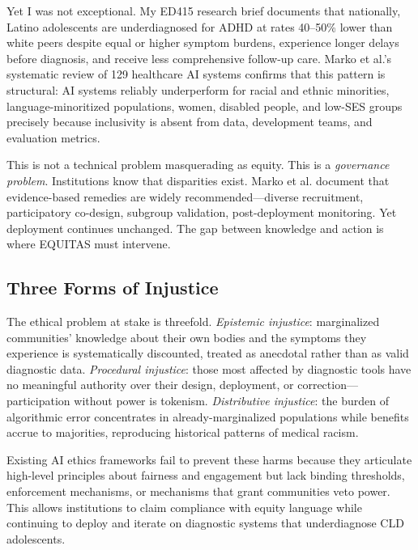 \documentclass[12pt,a4paper]{article}
\begin{document}
Yet I was not exceptional. My ED415 research brief documents that nationally, Latino adolescents are underdiagnosed for ADHD at rates 40--50\% lower than white peers despite equal or higher symptom burdens, experience longer delays before diagnosis, and receive less comprehensive follow-up care.\cite{garcia_ed415} Marko et al.'s systematic review of 129 healthcare AI systems confirms that this pattern is structural: AI systems reliably underperform for racial and ethnic minorities, language-minoritized populations, women, disabled people, and low-SES groups precisely because inclusivity is absent from data, development teams, and evaluation metrics.\cite{marko2025}

This is not a technical problem masquerading as equity. This is a \textit{governance problem}. Institutions know that disparities exist. Marko et al. document that evidence-based remedies are widely recommended—diverse recruitment, participatory co-design, subgroup validation, post-deployment monitoring.\cite{marko2025} Yet deployment continues unchanged. The gap between knowledge and action is where EQUITAS must intervene.

\subsection{Three Forms of Injustice}

The ethical problem at stake is threefold. \textit{Epistemic injustice}: marginalized communities' knowledge about their own bodies and the symptoms they experience is systematically discounted, treated as anecdotal rather than as valid diagnostic data.\cite{garcia_ed415} \textit{Procedural injustice}: those most affected by diagnostic tools have no meaningful authority over their design, deployment, or correction—participation without power is tokenism.\cite{nadarzynski2024} \textit{Distributive injustice}: the burden of algorithmic error concentrates in already-marginalized populations while benefits accrue to majorities, reproducing historical patterns of medical racism.\cite{marko2025}

Existing AI ethics frameworks fail to prevent these harms because they articulate high-level principles about fairness and engagement but lack binding thresholds, enforcement mechanisms, or mechanisms that grant communities veto power. This allows institutions to claim compliance with equity language while continuing to deploy and iterate on diagnostic systems that underdiagnose CLD adolescents.
\end{document}
